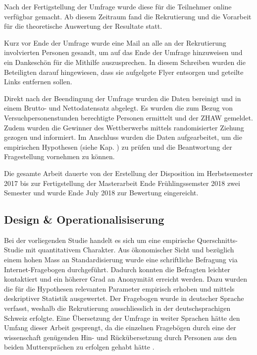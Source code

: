 Nach der Fertigstellung der Umfrage wurde diese für die Teilnehmer online verfügbar gemacht. Ab diesem Zeitraum fand die Rekrutierung und die Vorarbeit für die theoretische Auswertung der Resultate statt.

Kurz vor Ende der Umfrage wurde eine Mail an alle an der Rekrutierung involvierten Personen gesandt, um auf das Ende der Umfrage hinzuweisen und ein Dankeschön für die Mithilfe auszusprechen. In diesem Schreiben wurden die Beteiligten darauf hingewiesen, dass sie aufgelgete Flyer entsorgen und geteilte Links entfernen sollen. 

Direkt  nach der Beendingung der Umfrage wurden die Daten bereinigt und in einem Brutto- und Nettodatensatz abgelegt. Es wurden die zum Bezug von Versuchpersonenstunden berechtigte Personen ermittelt und der ZHAW gemeldet. Zudem wurden die Gewinner des Wettberwerbs mittels randomisierter Ziehung gezogen und informiert. Im Anschluss wurden die Daten aufgearbeitet, um die empirischen Hypothesen (siehe Kap. ) zu prüfen und die Beantwortung der Fragestellung vornehmen zu können.

Die gesamte Arbeit dauerte von der Erstellung der Disposition im Herbstsemester 2017 bis zur Fertigstellung der Masterarbeit Ende Frühlingssemster 2018 zwei Semester und wurde Ende July 2018 zur Bewertung eingereicht.

\subsection{Design \& Operationalisiserung} \label{sec:Design}
Bei der vorliegenden Studie handelt es sich um eine empirische Querschnitts-Studie mit quantitativem Charakter. Aus ökonomischer Sicht und bezüglich einem hohen Mass an Standardisierung \cite[S.~86ff]{sedlmeier2008} wurde eine schriftliche Befragung via Internet-Fragebogen durchgeführt. Dadurch konnten die Befragten leichter kontaktiert und ein höherer Grad an Anonymität erreicht werden. Dazu wurden die für die Hypothesen relevanten Parameter empirisch erhoben und mittels deskriptiver Statistik ausgewertet. Der Fragebogen wurde in deutscher Sprache verfasst, weshalb die Rekrutierung ausschliesslich in der deutschsprachigen Schweiz erfolgte. Eine Übersetzung der Umfrage in weiter Sprachen hätte den Umfang dieser Arbeit gesprengt, da die einzelnen Fragebögen durch eine der wissenschaft genügenden Hin- und Rückübersetzung durch Personen aus den beiden Muttersprächen zu erfolgen gehabt hätte \cite{Pfetsch2016}.

